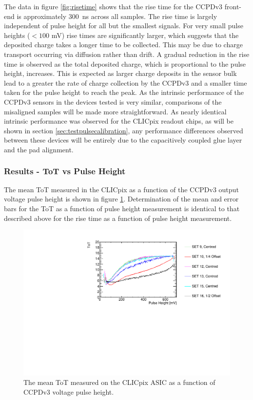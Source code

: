 The data in figure \ref{fig:risetime} shows that the rise time for the CCPDv3 front-end is approximately 300~ns across all samples.  The rise time is largely independent of pulse height for all but the smallest signals.  For very small pulse heights ($< 100$ mV) rise times are significantly larger, which suggests that the deposited charge takes a longer time to be collected.  This may be due to charge transport occurring via diffusion rather than drift.  A gradual reduction in the rise time is observed as the total deposited charge, which is proportional to the pulse height, increases.  This is expected as larger charge deposits in the sensor bulk lead to a greater the rate of charge collection by the CCPDv3 and a smaller time taken for the pulse height to reach the peak.  As the intrinsic performance of the CCPDv3 sensors in the devices tested is very similar, comparisons of the misaligned samples will be made more straightforward.  As nearly identical intrinsic performance was observed for the CLICpix readout chips, as will be shown in section \ref{sec:testpulsecalibration}, any performance differences observed between these devices will be entirely due to the capacitively coupled glue layer and the pad alignment.    


\subsubsection{Results - ToT vs Pulse Height}
\label{sec:resultstotpulseheight}
The mean ToT measured in the CLICpix as a function of the CCPDv3 output voltage pulse height is shown in figure \ref{fig:tot}.  Determination of the mean and error bars for the ToT as a function of pulse height measurement is identical to that described above for the rise time as a function of pulse height measurement.   

\begin{figure}[h!]
\centering
\includegraphics[width=1.0\textwidth]{CLICdpVertex/Plots/RadSourceAnalysis/AllSETs_TargetTot_PulseHeight.pdf}
\caption[The mean ToT measured on the CLICpix ASIC as a function of CCPDv3 voltage pulse height.]{The mean ToT measured on the CLICpix ASIC as a function of CCPDv3 voltage pulse height.}
\label{fig:tot}
\end{figure}

